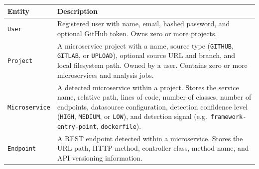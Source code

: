 \begin{table}[htbp]
    \centering
    \footnotesize
    \begin{tabular}{|l|p{9cm}|}
        \hline
        \textbf{Entity}              & \textbf{Description}                                                                                                                                                                                                                                                                                                                                                                                                          \\
        \hline\hline
        \texttt{User}                & Registered user with name, email, hashed password, and optional GitHub token. Owns zero or more projects.                                                                                                                                                                                                                                                                                                                     \\
        \hline
        \texttt{Project}             & A microservice project with a name, source type (\texttt{GITHUB}, \texttt{GITLAB}, or \texttt{UPLOAD}), optional source URL and branch, and local filesystem path. Owned by a user. Contains zero or more microservices and analysis jobs.                                                                                                                                                                                    \\
        \hline
        \texttt{Microservice}        & A detected microservice within a project. Stores the service name, relative path, lines of code, number of classes, number of endpoints, datasource configuration, detection confidence level (\texttt{HIGH}, \texttt{MEDIUM}, or \texttt{LOW}), and detection signal (e.g.\ \texttt{framework-entry-point}, \texttt{dockerfile}).                                                                                                                                                                                                                                                        \\
        \hline
        \texttt{Endpoint}            & A REST endpoint detected within a microservice. Stores the URL path, HTTP method, controller class, method name, and API versioning information.                                                                                                                                                                                                                                                                              \\

\end{tabular}
\end{table}
